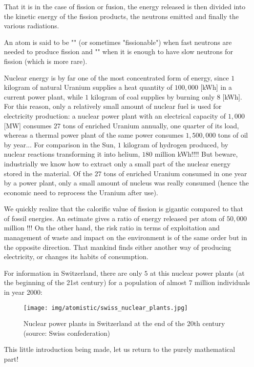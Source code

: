 	That it is in the case of fission or fusion, the energy released is then divided into the kinetic energy of the fission products, the neutrons emitted and finally the various radiations.
	\begin{tcolorbox}[title=Remark,colframe=black,arc=10pt]
	An atom is said to be "" (or sometimes "fissionable") when fast neutrons are needed to produce fission and "" when it is enough to have slow neutrons for fission (which is more rare).
	\end{tcolorbox}
	Nuclear energy is by far one of the most concentrated form of energy, since $1$ kilogram of natural Uranium supplies a heat quantity of $100,000$ [kWh] in a current power plant, while $1$ kilogram of coal supplies by burning only $8$ [kWh]. For this reason, only a relatively small amount of nuclear fuel is used for electricity production: a nuclear power plant with an electrical capacity of $1,000$ [MW] consumes $27$ tons of enriched Uranium annually, one quarter of its load, whereas a thermal power plant of the same power consumes $1,500,000$ tons of oil by year... For comparison in the Sun, $1$ kilogram of hydrogen produced, by nuclear reactions transforming it into helium, $180$ million kWh!!!! But beware, industrially we know how to extract only a small part of the nuclear energy stored in the material. Of the $27$ tons of enriched Uranium consumed in one year by a power plant, only a small amount of nucleus was really consumed (hence the economic need to reprocess the Uranium after use).

	We quickly realize that the calorific value of fission is gigantic compared to that of fossil energies. An estimate gives a ratio of energy released per atom of $50,000$ million !!! On the other hand, the risk ratio in terms of exploitation and management of waste and impact on the environment is of the same order but in the opposite direction. That mankind finds either another way of producing electricity, or changes its habits of consumption.

	For information in Switzerland, there are only $5$ at this nuclear power plants (at the beginning of the 21st century) for a population of almost $7$ million individuals in year 2000:
	 \begin{figure}[H]
		\centering
		\texttt{[image: img/atomistic/swiss\_nuclear\_plants.jpg]}
		\caption[Nuclear power plants in Switzerland at the end of the 20th century]{Nuclear power plants in Switzerland at the end of the 20th century (source: Swiss confederation)}
	\end{figure}
	This little introduction being made, let us return to the purely mathematical part!


